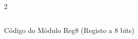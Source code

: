 \begin{figure}[H]
    \centering   
    \begin{tcolorbox}  
        \begin{multicols}{2} 
        \fontsize{9pt}{9pt}\selectfont\inputminted[obeytabs=true,tabsize=4,xleftmargin=20pt,linenos,breaklines]{VHDL}{VHDL/files/Reg8.vhd}    
        \end{multicols}
    \end{tcolorbox}   
    \caption{Código do Módulo Reg8 (Registo a 8 bits)}
\end{figure}